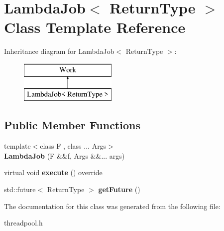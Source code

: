 \section{Lambda\+Job$<$ Return\+Type $>$ Class Template Reference}
\label{classLambdaJob}
Inheritance diagram for Lambda\+Job$<$ Return\+Type $>$\+:\begin{figure}[H]
\begin{center}
\leavevmode
\includegraphics[height=2.000000cm]{classLambdaJob}
\end{center}
\end{figure}
\subsection*{Public Member Functions}
\begin{DoxyCompactItemize}
\item 
\mbox{\label{classLambdaJob_a583408c583a9ddf8f6f197d57fe67bd4}} 
{\footnotesize template$<$class F , class ... Args$>$ }\\{\bfseries Lambda\+Job} (F \&\&f, Args \&\&... args)
\item 
\mbox{\label{classLambdaJob_ad66120146040990a73b0fe34ba01513c}} 
virtual void {\bfseries execute} () override
\item 
\mbox{\label{classLambdaJob_ac42f440f4bfaa8cdc286105880d9a6d1}} 
std\+::future$<$ Return\+Type $>$ {\bfseries get\+Future} ()
\end{DoxyCompactItemize}


The documentation for this class was generated from the following file\+:\begin{DoxyCompactItemize}
\item 
threadpool.\+h\end{DoxyCompactItemize}
